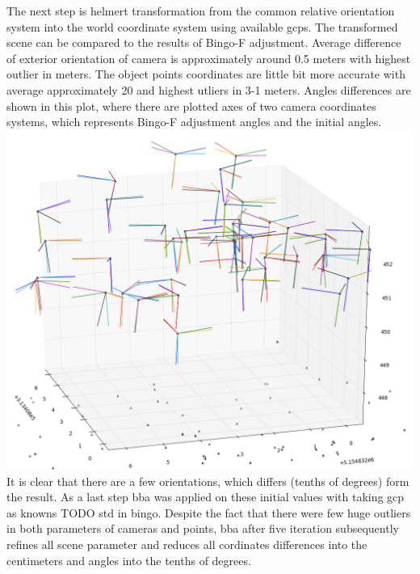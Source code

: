 \documentclass[a4paper,12pt]{report}
\begin{document}
The next step is helmert transformation from the common relative orientation system into the world coordinate system using available gcps. 
The transformed scene can be compared to the results of Bingo-F adjustment. Average difference of exterior orientation 
of camera is approximately around 0.5 meters with highest outlier in meters. The object points coordinates 
are little bit more accurate with average approximately 20 and highest utliers in 3-1 meters. 
Angles differences are shown in this plot, where there are plotted axes of two camera coordinates systems, which represents 
Bingo-F adjustment angles and the  initial angles. 
\includegraphics[scale=0.4]{figures/angles_comaprison_relative_orinetaion.png}
It is clear that there are a few orientations, which differs  (tenths of degrees) form the result. 
As a last step bba was applied on these initial values with taking gcp as knowns TODO std in bingo.
Despite the fact that there were few huge outliers in both parameters of cameras and points,
bba after five iteration subsequently refines all scene parameter and reduces all cordinates 
differences into the centimeters and angles into the tenths of degrees. 
\end{document}
